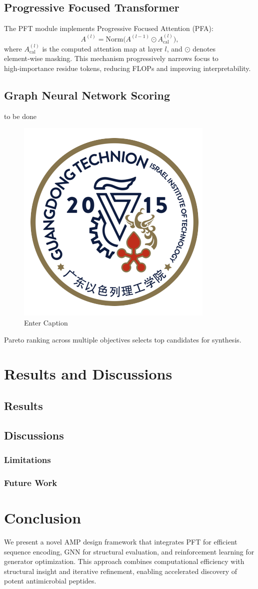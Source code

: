\documentclass{article}
\begin{document}
\subsection{Progressive Focused Transformer}
The PFT module implements Progressive Focused Attention (PFA):
\begin{equation}
    A^{(l)} = \mathrm{Norm}\bigl(A^{(l-1)} \odot A_{\text{cal}}^{(l)}\bigr),
\end{equation}
where $A_{\text{cal}}^{(l)}$ is the computed attention map at layer $l$, and $\odot$ denotes element‑wise masking. This mechanism progressively narrows focus to high‑importance residue tokens, reducing FLOPs and improving interpretability.

\subsection{Graph Neural Network Scoring}
to be done

\begin{figure}[h]
    \centering
    \includegraphics[width=0.2\linewidth]{GTIIT.png}
    \caption{Enter Caption}
    \label{fig:placeholder}
\end{figure}

Pareto ranking across multiple objectives selects top candidates for synthesis.


\section{Results and Discussions}
\subsection{Results}


\subsection{Discussions}
\subsubsection{Limitations}



\subsubsection{Future Work}
\section{Conclusion}
We present a novel AMP design framework that integrates PFT for efficient sequence encoding, GNN for structural evaluation, and reinforcement learning for generator optimization. This approach combines computational efficiency with structural insight and iterative refinement, enabling accelerated discovery of potent antimicrobial peptides.
\end{document}
